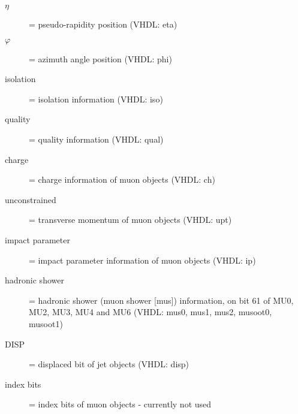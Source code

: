 \begin{description}
\item [{$\eta$}] = pseudo-rapidity position (VHDL: eta)
\item [{$\varphi$}] = azimuth angle position (VHDL: phi)
\item [{isolation}] = isolation information (VHDL: iso)
\item [{quality}] = quality information (VHDL: qual)
\item [{charge}] = charge information of muon objects (VHDL: ch)
\item [{unconstrained \pt}] = transverse momentum of muon objects (VHDL: upt)
\item [{impact parameter}] = impact parameter information of muon objects (VHDL: ip)
\item [{hadronic shower}] = hadronic shower (muon shower [mus]) information, on bit 61 of MU0, MU2, MU3, MU4 and MU6 (VHDL: mus0, mus1, mus2, musoot0, musoot1)
\item [{DISP}] = displaced bit of jet objects (VHDL: disp)
\item [{index bits}] = index bits of muon objects - currently not used
\end{description}

\clearpage
